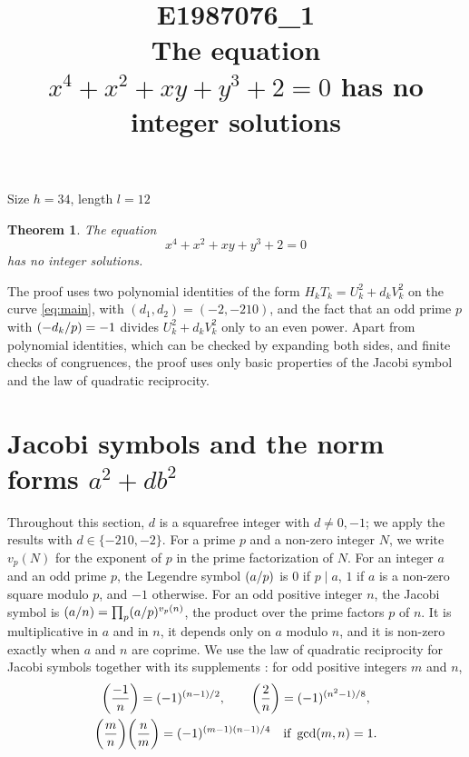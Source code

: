 \documentclass[11pt]{article}
\title{\textbf{E1987076\_1}\\[4pt] {\Large The equation $x^{4}+x^{2}+xy+y^{3}+2=0$ has no integer solutions}}
\author{}
\date{}
\newtheorem{theorem}{Theorem}
\newcommand{\leg}[2]{\mathchoice{\biggl(\dfrac{#1}{#2}\biggr)}{(#1/#2)}{(#1/#2)}{(#1/#2)}}
\begin{document}
\maketitle
\vspace{-8ex}
\begin{center}
Size $h=34$, length $l=12$
\end{center}

\begin{theorem}\label{thm:main}
The equation
\begin{equation}\label{eq:main}
x^{4}+x^{2}+xy+y^{3}+2=0
\end{equation}
has no integer solutions.
\end{theorem}

The proof uses two polynomial identities of the form $H_kT_k=U_k^2+d_kV_k^2$ on the curve \eqref{eq:main}, with $(d_1,d_2)=(-2,-210)$, and the fact that an odd prime $p$ with $\leg{-d_k}{p}=-1$ divides $U_k^2+d_kV_k^2$ only to an even power. Apart from polynomial identities, which can be checked by expanding both sides, and finite checks of congruences, the proof uses only basic properties of the Jacobi symbol and the law of quadratic reciprocity.

\section{Jacobi symbols and the norm forms $a^2+db^2$}

Throughout this section, $d$ is a squarefree integer with $d\neq0,-1$; we apply the results with $d\in\{-210,-2\}$. For a prime $p$ and a non-zero integer $N$, we write $v_p(N)$ for the exponent of $p$ in the prime factorization of $N$. For an integer $a$ and an odd prime $p$, the Legendre symbol $\leg{a}{p}$ is $0$ if $p\mid a$, $1$ if $a$ is a non-zero square modulo $p$, and $-1$ otherwise. For an odd positive integer $n$, the Jacobi symbol is $\leg{a}{n}=\prod_p\leg{a}{p}^{v_p(n)}$, the product over the prime factors $p$ of $n$. It is multiplicative in $a$ and in $n$, it depends only on $a$ modulo $n$, and it is non-zero exactly when $a$ and $n$ are coprime. We use the law of quadratic reciprocity for Jacobi symbols together with its supplements \cite[Chapter~5, \S2]{IR}: for odd positive integers $m$ and $n$,
\begin{gather*}
\leg{-1}{n}=(-1)^{(n-1)/2},\qquad\leg{2}{n}=(-1)^{(n^2-1)/8},\\
\leg{m}{n}\leg{n}{m}=(-1)^{(m-1)(n-1)/4}\quad\text{if }\gcd(m,n)=1.
\end{gather*}
\end{document}

